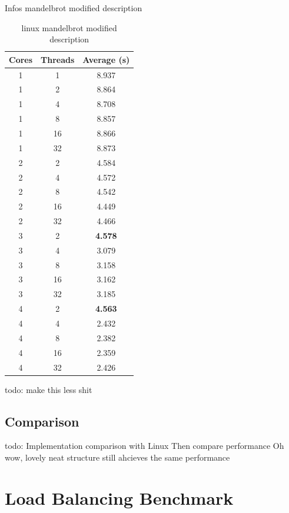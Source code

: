 \documentclass[bsc,frontabs,twoside,singlespacing,parskip,deptreport]{infthesis}     %
\begin{document}
\begin{table}[h]
{\caption{Infos mandelbrot modified description}
}
\hfill
\parbox{.45\linewidth}{
\centering
\label{timing-linux-mb-mod}
\scriptsize
\begin{tabular}{ccc}
\toprule
Cores &Threads &Average (s) \\
\midrule
1 &1 &8.937 \\
\midrule
1 &2 &8.864 \\
1 &4 &8.708 \\
1 &8 &8.857 \\
1 &16 &8.866 \\
1 &32 &8.873 \\
\midrule
2 &2 &4.584 \\
2 &4 &4.572 \\
2 &8 &4.542 \\
2 &16 &4.449 \\
2 &32 &4.466 \\
\midrule
3 &2 &\textbf{4.578} \\
3 &4 &3.079 \\
3 &8 &3.158 \\
3 &16 &3.162 \\
3 &32 &3.185 \\
\midrule
4 &2 &\textbf{4.563} \\
4 &4 &2.432 \\
4 &8 &2.382 \\
4 &16 &2.359 \\
4 &32 &2.426 \\
\bottomrule
\end{tabular}
\caption{linux mandelbrot modified description}
}
\end{table}

todo: make this less shit


\subsection{Comparison}
todo: Implementation comparison with Linux
Then compare performance
Oh wow, lovely neat structure still ahcieves the same performance

\section{Load Balancing Benchmark} \label{cache-benchmark}
\end{document}
